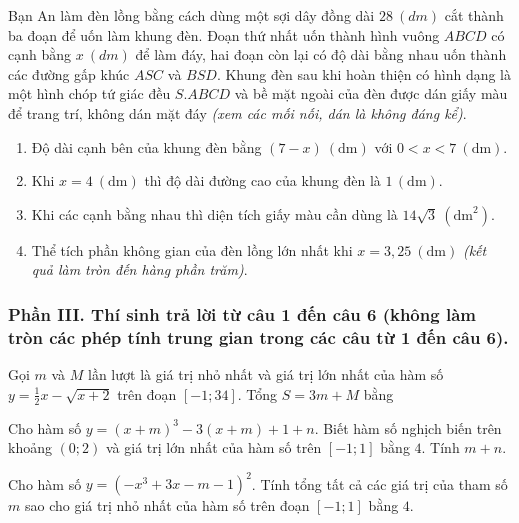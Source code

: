 \begin{baitap}
	Bạn An làm đèn lồng bằng cách dùng một sợi dây đồng dài $\SI{28}{(dm)}$ cắt thành ba đoạn để uốn làm khung đèn. Đoạn thứ nhất uốn thành hình vuông $ABCD$ có cạnh bằng $x\ (\si{dm})$ để làm đáy, hai đoạn còn lại có độ dài bằng nhau uốn thành các đường gấp khúc $ASC$ và $BSD$. Khung đèn sau khi hoàn thiện có hình dạng là một hình chóp tứ giác đều $S.ABCD$ và bề mặt ngoài của đèn được dán giấy màu để trang trí, không dán mặt đáy \textit{(xem các mối nối, dán là không đáng kể)}.
	\begin{enumerate}[\quad \bf a)]
		\item Độ dài cạnh bên của khung đèn bằng $(7 - x)\ (\text{dm})$ với $0 < x < 7\ (\text{dm})$.
		\item Khi $x = 4\ (\text{dm})$ thì độ dài đường cao của khung đèn là $1\, (\text{dm})$.
		\item Khi các cạnh bằng nhau thì diện tích giấy màu cần dùng là $14\sqrt{3}\ (\text{dm}^2)$.
		\item Thể tích phần không gian của đèn lồng lớn nhất khi $x = 3,25\ (\text{dm})$ \textit{(kết quả làm tròn đến hàng phần trăm)}.
	\end{enumerate}
\end{baitap}


\subsubsection*{Phần III. Thí sinh trả lời từ câu 1 đến câu 6 (không làm tròn các phép tính trung gian trong các câu từ 1 đến câu 6).}
\setcounter{bt}{0}

\begin{baitap}
	Gọi $m$ và $M$ lần lượt là giá trị nhỏ nhất và giá trị lớn nhất của hàm số $y = \frac{1}{2}x - \sqrt{x+2}$ trên đoạn $[-1; 34]$. Tổng $S = 3m + M$ bằng
\end{baitap}

\begin{baitap}
	Cho hàm số $y = (x+m)^3 - 3(x+m) + 1 + n$. Biết hàm số nghịch biến trên khoảng $(0; 2)$ và giá trị lớn nhất của hàm số trên $[-1; 1]$ bằng $4$. Tính $m+n$.
\end{baitap}

\begin{baitap}
	Cho hàm số $y = (-x^3 + 3x - m - 1)^2$. Tính tổng tất cả các giá trị của tham số $m$ sao cho giá trị nhỏ nhất của hàm số trên đoạn $[-1; 1]$ bằng $4$.
\end{baitap}

